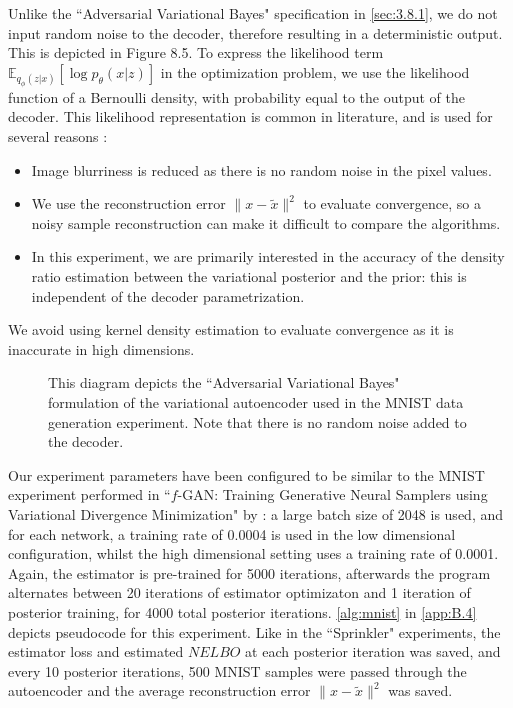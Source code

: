 \documentclass[honours,12pt, twoside]{unswthesis}
\newcommand{\E}{\mathbb{E}}
\numberwithin{equation}{section}
\theoremstyle{definition}
\begin{document}
Unlike the ``Adversarial Variational Bayes" specification in \autoref{sec:3.8.1}, we do not input random noise to the decoder, therefore resulting in a deterministic output. This is depicted in Figure 8.5. To express the likelihood term $\E_{q_\phi(z|x)}[\log p_\theta(x|z)]$ in the optimization problem, we use the likelihood function of a Bernoulli density, with probability equal to the output of the decoder. This likelihood representation is common in literature, and is used for several reasons \citep{nowozin,bgan, tiao}:
\begin{itemize}
\item Image blurriness is reduced as there is no random noise in the pixel values.
\item We use the reconstruction error $\|x-\tilde{x}\|^2$ to evaluate convergence, so a noisy sample reconstruction can make it difficult to compare the algorithms.
\item In this experiment, we are primarily interested in the accuracy of the density ratio estimation between the variational posterior and the prior: this is independent of the decoder parametrization.
\end{itemize}
We avoid using kernel density estimation to evaluate convergence as it is inaccurate in high dimensions.
\begin{figure}[h]
  \centering
   \caption{\small This diagram depicts the ``Adversarial Variational Bayes" formulation of the variational autoencoder used in the MNIST data generation experiment. Note that there is no random noise added to the decoder.}
\end{figure}

Our experiment parameters have been configured to be similar to the MNIST experiment performed in ``$f$-GAN: Training Generative Neural Samplers using Variational Divergence Minimization" by \citet{nowozin}: a large batch size of 2048 is used, and for each network, a training rate of 0.0004 is used in the low dimensional configuration, whilst the high dimensional setting uses a training rate of 0.0001. Again, the estimator is pre-trained for 5000 iterations, afterwards the program alternates between 20 iterations of estimator optimizaton and 1 iteration of posterior training, for 4000 total posterior iterations. \autoref{alg:mnist} in \autoref{app:B.4} depicts pseudocode for this experiment. Like in the ``Sprinkler" experiments, the estimator loss and estimated $NELBO$ at each posterior iteration was saved, and every 10 posterior iterations, 500 MNIST samples were passed through the autoencoder and the average reconstruction error $\|x-\tilde{x}\|^2$ was saved.
\end{document}

